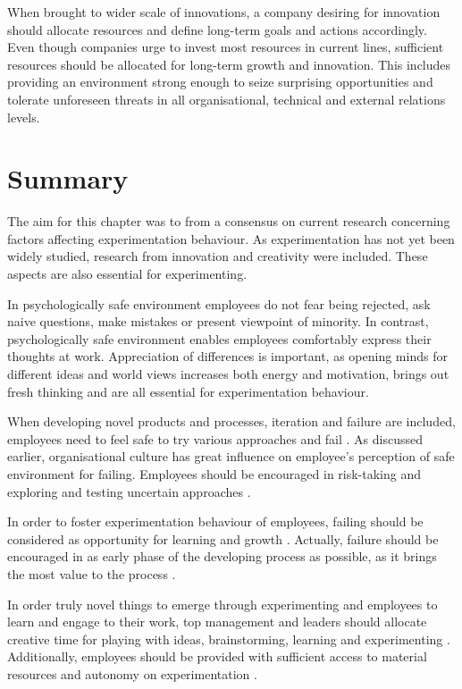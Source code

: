 When brought to wider scale of innovations, a company desiring for innovation should allocate resources and define long-term goals and actions accordingly. Even though companies urge to invest most resources in current lines, sufficient resources should be allocated for long-term growth and innovation. This includes providing an environment strong enough to seize surprising opportunities and tolerate unforeseen threats in all organisational, technical and external relations levels. \citep{quinn1985managing} 

\section{Summary}
The aim for this chapter was to from a consensus on current research concerning factors affecting experimentation behaviour. As experimentation has not yet been widely studied, research from innovation and creativity were included. These aspects are also essential for experimenting.  

In psychologically safe environment employees do not fear being rejected, ask naive questions, make mistakes or present viewpoint of minority. In contrast, psychologically safe environment enables employees comfortably express their thoughts at work. Appreciation of differences is important, as opening minds for different ideas and world views increases both energy and motivation, brings out fresh thinking and are all essential for experimentation behaviour. \citep{garvin2008yours} 

When developing novel products and processes, iteration and failure are included, employees need to feel safe to try various approaches and fail \citep{shalley2004leaders}. As discussed earlier, organisational culture has great influence on employee's perception of safe environment for failing. Employees should be encouraged in risk-taking and exploring and testing uncertain approaches \citep{garvin2008yours}.

In order to foster experimentation behaviour of employees, failing should be considered as opportunity for learning and growth \citep{farson2002failuretolerantleader}. Actually, failure should be encouraged in as early phase of the developing process as possible, as it brings the most value to the process \citep{thomke2001enlightened}.

In order truly novel things to emerge through experimenting and employees to learn and engage to their work, top management and leaders should allocate creative time for playing with ideas, brainstorming, learning and experimenting \citep{amabile2002creativity}. Additionally, employees should be provided with sufficient access to material resources \citep{katz1985project} and autonomy on experimentation \citep{shalley2004leaders}. 

